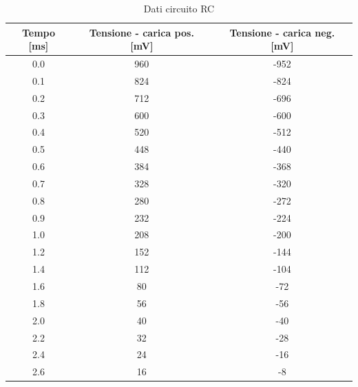 \documentclass[letterpaper,12pt]{article}
\begin{document}
\begin{table}[htbp]
	\centering
	\caption{Dati circuito RC}
	\begin{tabular}{ccc}
		\toprule
		Tempo [ms] & Tensione - carica pos. [mV] & Tensione - carica neg. [mV] \\
		\midrule
		0.0        & 960                         & -952                        \\
		0.1        & 824                         & -824                        \\
		0.2        & 712                         & -696                        \\
		0.3        & 600                         & -600                        \\
		0.4        & 520                         & -512                        \\
		0.5        & 448                         & -440                        \\
		0.6        & 384                         & -368                        \\
		0.7        & 328                         & -320                        \\
		0.8        & 280                         & -272                        \\
		0.9        & 232                         & -224                        \\
		1.0        & 208                         & -200                        \\
		1.2        & 152                         & -144                        \\
		1.4        & 112                         & -104                        \\
		1.6        & 80                          & -72                         \\
		1.8        & 56                          & -56                         \\
		2.0        & 40                          & -40                         \\
		2.2        & 32                          & -28                         \\
		2.4        & 24                          & -16                         \\
		2.6        & 16                          & -8                          \\
		\bottomrule
	\end{tabular}
	\label{tab:dati_RC}
\end{table}
\end{document}

